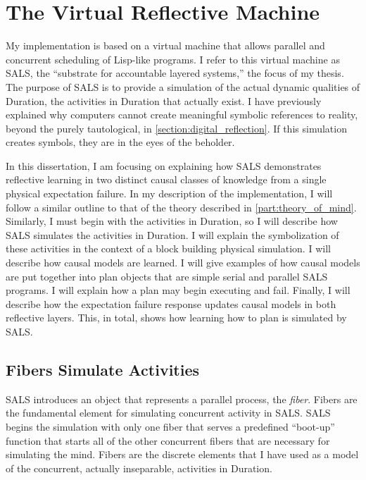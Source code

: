 \chapter{The Virtual Reflective Machine}
\label{chapter:the_virtual_reflective_machine}

\newcommand{\SALS}{SALS}

My implementation is based on a virtual machine that allows parallel
and concurrent scheduling of Lisp-like programs.  I refer to this
virtual machine as {\SALS}, the ``substrate for accountable layered
systems,'' the focus of my thesis.  The purpose of {\SALS} is to
provide a simulation of the actual dynamic qualities of Duration, the
activities in Duration that actually exist.  I have previously
explained why computers cannot create meaningful symbolic references
to reality, beyond the purely tautological, in
\autoref{section:digital_reflection}.  If this simulation creates
symbols, they are in the eyes of the beholder.

In this dissertation, I am focusing on explaining how {\SALS}
demonstrates reflective learning in two distinct causal classes of
knowledge from a single physical expectation failure.  In my
description of the implementation, I will follow a similar outline to
that of the theory described in \autoref{part:theory_of_mind}.
Similarly, I must begin with the activities in Duration, so I will
describe how {\SALS} simulates the activities in Duration.  I will
explain the symbolization of these activities in the context of a
block building physical simulation.  I will describe how causal models
are learned.  I will give examples of how causal models are put
together into plan objects that are simple serial and parallel {\SALS}
programs.  I will explain how a plan may begin executing and fail.
Finally, I will describe how the expectation failure response updates
causal models in both reflective layers.  This, in total, shows how
learning how to plan is simulated by {\SALS}.

\section{Fibers Simulate Activities}

{\SALS} introduces an object that represents a parallel process, the
\emph{fiber}.  Fibers are the fundamental element for simulating
concurrent activity in {\SALS}.  {\SALS} begins the simulation with only
one fiber that serves a predefined ``boot-up'' function that starts
all of the other concurrent fibers that are necessary for simulating
the mind.  Fibers are the discrete elements that I have used as a
model of the concurrent, actually inseparable, activities in Duration.

